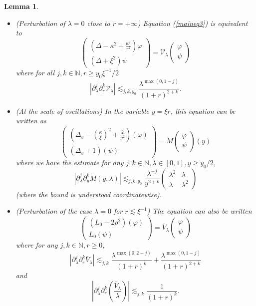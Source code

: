 \documentclass[11 pt]{amsart}
\newtheorem{lem}{Lemma}[section]
\theoremstyle{definition}
\theoremstyle{remark}
\numberwithin{equation}{section}
\begin{document}
\begin{lem}
  \label{eqsec9}
\begin{itemize}
\item[1)] (Perturbation of $\lambda = 0$ close to $r = + \infty$) Equation
  (\ref{maineq3}) is equivalent to
  \[ \left(\begin{array}{c}
       \left( \Delta - \kappa^2 + \frac{\kappa^2}{r^2} \right) \varphi\\
       (\Delta + \xi^2) \psi
     \end{array}\right) =\mathcal{V}_{\lambda} \left(\begin{array}{c}
       \varphi\\
       \psi
     \end{array}\right) \]
  where for all $j, k \in \mathbb{N}, r \geqslant y_0 \xi^{- 1}/2$
  \[ | \partial_{\lambda}^j \partial_r^k \mathcal{V}_{\lambda} | \lesssim_{j,
     k,y_0} \frac{\lambda^{\max (0, 1 - j)}}{(1 + r)^{2+k}} . \]
  
\item[2)] (At the scale of oscillations) In the variable $y = \xi r$, this equation
  can be written as
  \[ \left(\begin{array}{c}
       \left( \Delta_y - \left( \frac{\kappa}{\xi} \right)^2 + \frac{2}{y^2}
       \right) (\varphi)\\
       (\Delta_y + 1) (\psi)
     \end{array}\right) = \widetilde{M} \left(\begin{array}{c}
       \varphi\\
       \psi
     \end{array}\right) (y) \]
  where we have the estimate for any $j, k \in \mathbb{N}, \lambda \in [0, 1],
  y \geqslant y_0/2$,
  \[ | \partial_{\lambda}^j \partial_y^k \widetilde{M} (y, \lambda) | \lesssim_{j,
     k,y_0} \frac{\lambda^{- j}}{y^{2 + k}} \left(\begin{array}{cc}
       \lambda^2 & \lambda\\
       \lambda & \lambda^2
     \end{array}\right) \]
(where the bound is understood coordinatewise).
  
\item[3)] (Perturbation of the case $\lambda = 0$ for $r \lesssim \xi^{-1}$) The equation can also be written 
  \[ \left(\begin{array}{c}
       (L_0 - 2 \rho^2) (\varphi)\\
       L_0 (\psi)
     \end{array}\right) = \bar{V}_{\lambda} \left(\begin{array}{c}
       \varphi\\
       \psi
     \end{array}\right) \]
  where for any $j, k \in \mathbb{N}, r \geqslant 0$,
  \[ | \partial_{\lambda}^j \partial_r^k \bar{V}_{\lambda} | \lesssim_{j, k}
     \frac{\lambda^{\max (0, 2 - j)}}{(1 + r)^k} + \frac{\lambda^{\max (0, 1 -
     j)}}{(1 + r)^{2 + k}} \]
  and
  \[ \left| \partial_{\lambda}^j \partial_r^k \left(
     \frac{\bar{V}_{\lambda}}{\lambda} \right) \right| \lesssim_{j, k}
     \frac{1}{(1 + r)^k} . \]
  

\end{itemize}
\end{lem}
\end{document}
